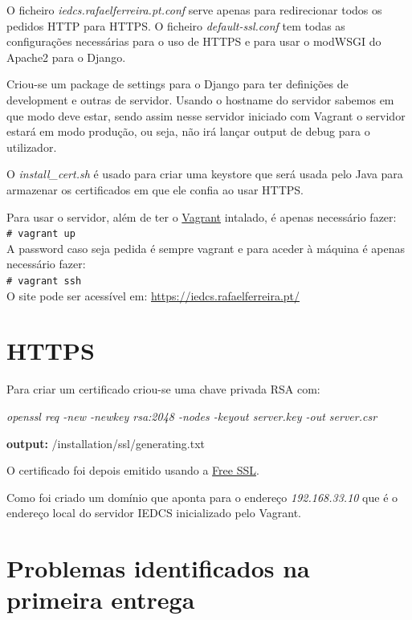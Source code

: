 \documentclass[pdftex,12pt,a4paper]{report}
\newcommand{\shellcmd}[1]{\\\indent\indent\texttt{\footnotesize\# #1}\\}
\begin{document}
O ficheiro \textit{iedcs.rafaelferreira.pt.conf} serve apenas para redirecionar todos os pedidos HTTP para HTTPS. O ficheiro \textit{default-ssl.conf} tem todas as configurações necessárias para o uso de HTTPS e para usar o modWSGI do Apache2 para o Django.

Criou-se um package de settings para o Django para ter definições de development e outras de servidor. Usando o hostname do servidor sabemos em que modo deve estar, sendo assim nesse servidor iniciado com Vagrant o servidor estará em modo produção, ou seja, não irá lançar output de debug para o utilizador.

O \textit{install{\_}cert.sh} é usado para criar uma keystore que será usada pelo Java para armazenar os certificados em que ele confia ao usar HTTPS.	
	
Para usar o servidor, além de ter o \href{https://www.vagrantup.com/downloads.html}{Vagrant} intalado, é apenas necessário fazer:
\shellcmd{vagrant up}

A password caso seja pedida é sempre vagrant e para aceder à máquina é apenas necessário fazer: \shellcmd{vagrant ssh}

O site pode ser acessível em: \url{https://iedcs.rafaelferreira.pt/}

\section{HTTPS}
Para criar um certificado criou-se uma chave privada RSA com:

\textit{openssl req -new -newkey rsa:2048 -nodes -keyout server.key -out server.csr}

\textbf{output:} /installation/ssl/generating.txt

O certificado foi depois emitido usando a \href{https://www.instantssl.com/free-ssl-certificate.html}{Free SSL}.

Como foi criado um domínio que aponta para o endereço \textit{192.168.33.10} que é o endereço local do servidor IEDCS inicializado pelo Vagrant.

\section{Problemas identificados na primeira entrega}
\end{document}
